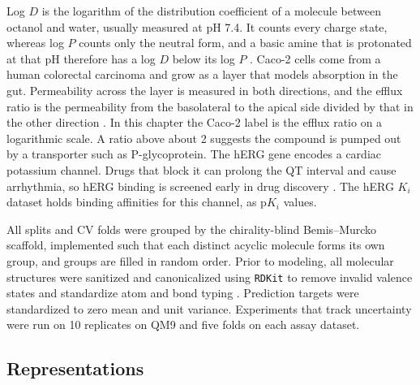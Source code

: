 Log $D$ is the logarithm of the distribution coefficient of a molecule between octanol and water, usually measured at pH 7.4. It counts every charge state, whereas log $P$ counts only the neutral form, and a basic amine that is protonated at that pH therefore has a log $D$ below its log $P$ \citep{Bhal2007}. Caco-2 cells come from a human colorectal carcinoma and grow as a layer that models absorption in the gut. Permeability across the layer is measured in both directions, and the efflux ratio is the permeability from the basolateral to the apical side divided by that in the other direction \citep{Hubatsch2007}. In this chapter the Caco-2 label is the efflux ratio on a logarithmic scale. A ratio above about 2 suggests the compound is pumped out by a transporter such as P-glycoprotein. The hERG gene encodes a cardiac potassium channel. Drugs that block it can prolong the QT interval and cause arrhythmia, so hERG binding is screened early in drug discovery \citep{Sanguinetti2006}. The hERG $K_i$ dataset holds binding affinities for this channel, as p$K_i$ values.

All splits and CV folds were grouped by the chirality-blind Bemis--Murcko scaffold, implemented such that each distinct acyclic molecule forms its own group, and groups are filled in random order. Prior to modeling, all molecular structures were sanitized and canonicalized using \texttt{RDKit} to remove invalid valence states and standardize atom and bond typing \citep{rdkit}. Prediction targets were standardized to zero mean and unit variance. Experiments that track uncertainty were run on 10 replicates on QM9 and five folds on each assay dataset.

\subsection{Representations}

